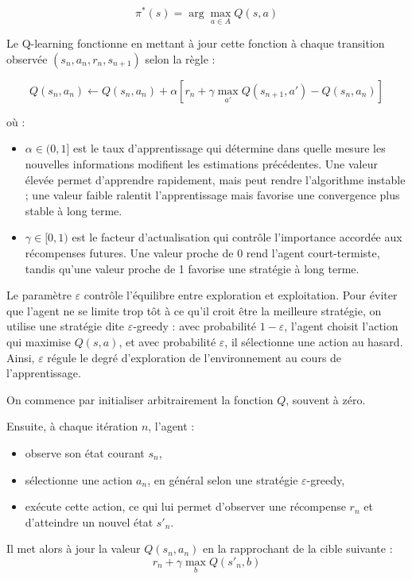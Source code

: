 \documentclass[12pt]{article}
\begin{document}
\[
\pi^*(s) = \arg\max_{a \in A} Q(s,a)
\]

Le Q-learning fonctionne en mettant à jour cette fonction à chaque transition observée \((s_n, a_n, r_n, s_{n+1})\) selon la règle :

\[
Q(s_n, a_n) \leftarrow Q(s_n, a_n) + \alpha \left[r_n + \gamma \max_{a'} Q(s_{n+1}, a') - Q(s_n, a_n) \right]
\]

où :
\begin{itemize}
    \item \(\alpha \in (0,1]\) est le taux d’apprentissage qui détermine dans quelle mesure les nouvelles informations modifient les estimations précédentes. Une valeur élevée permet d’apprendre rapidement, mais peut rendre l’algorithme instable ; une valeur faible ralentit l’apprentissage mais favorise une convergence plus stable à long terme.

    \item \(\gamma \in [0,1)\) est le facteur d’actualisation qui contrôle l’importance accordée aux récompenses futures. Une valeur proche de 0 rend l’agent court-termiste, tandis qu’une valeur proche de 1 favorise une stratégie à long terme.
\end{itemize} 

Le paramètre \(\varepsilon\) contrôle l’équilibre entre exploration et exploitation. Pour éviter que l’agent ne se limite trop tôt à ce qu’il croit être la meilleure stratégie, on utilise une stratégie dite \(\varepsilon\)-greedy : avec probabilité \(1 - \varepsilon\), l’agent choisit l’action qui maximise \(Q(s,a)\), et avec probabilité \(\varepsilon\), il sélectionne une action au hasard. Ainsi, \(\varepsilon\) régule le degré d’exploration de l’environnement au cours de l’apprentissage.


On commence par initialiser arbitrairement la fonction \(Q\), souvent à zéro.

Ensuite, à chaque itération \(n\), l’agent :
\begin{itemize}
    \item observe son état courant \(s_n\),
    \item sélectionne une action \(a_n\), en général selon une stratégie \(\varepsilon\)-greedy,
    \item exécute cette action, ce qui lui permet d’observer une récompense \(r_n\) et d’atteindre un nouvel état \(s'_n\).
\end{itemize}

Il met alors à jour la valeur \(Q(s_n, a_n)\) en la rapprochant de la cible suivante :
\[
r_n + \gamma \max_b Q(s'_n, b)
\]
\end{document}
